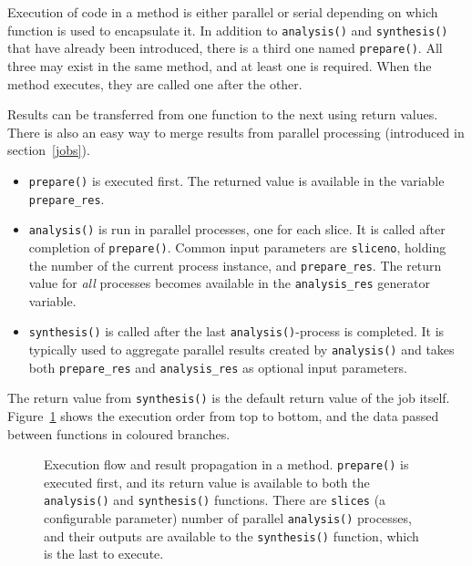 Execution of code in a method is either parallel or serial depending
on which function is used to encapsulate it.  In addition to
\texttt{analysis()} and \texttt{synthesis()} that have already been
introduced, there is a third one named \texttt{prepare()}.  All three
may exist in the same method, and at least one is required.  When the
method executes, they are called one after the other.

Results can be transferred from one function to the next using return
values.  There is also an easy way to merge results from parallel
processing (introduced in section~\ref{jobs}).

\begin{itemize}
\item[] \texttt{prepare()} is executed first.  The returned value is
  available in the variable \texttt{prepare\_res}.
\item[] \texttt{analysis()} is run in parallel processes, one for each
  slice.  It is called after completion of \texttt{prepare()}.  Common
  input parameters are \texttt{sliceno}, holding the number of the
  current process instance, and \texttt{prepare\_res}.  The return
  value for \emph{all} processes becomes available in the
  \texttt{analysis\_res} generator variable.
\item[] \texttt{synthesis()} is called after the last
  \texttt{analysis()}-process is completed.  It is typically used to
  aggregate parallel results created by \texttt{analysis()} and takes
  both \texttt{prepare\_res} and \texttt{analysis\_res} as optional
  input parameters.
\end{itemize}
The return value from \texttt{synthesis()} is the default return value
of the job itself.  Figure~\ref{fig:prepanasyn} shows the execution
order from top to bottom, and the data passed between functions in
coloured branches.

\begin{figure}[b]
  \begin{center}
    
    \caption{Execution flow and result propagation in a method.
      \texttt{prepare()} is executed first, and its return value is
      available to both the \texttt{analysis()} and
      \texttt{synthesis()} functions.  There are \texttt{slices} (a
      configurable parameter) number of parallel \texttt{analysis()}
      processes, and their outputs are available to the
      \texttt{synthesis()} function, which is the last to execute.}
    \label{fig:prepanasyn}
  \end{center}
\end{figure}





